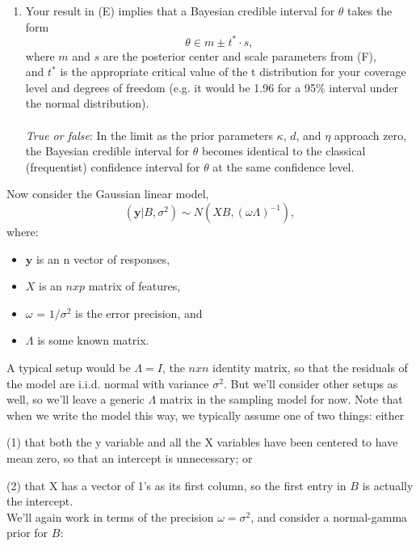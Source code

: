 \documentclass{homework}
\begin{document}
\begin{enumerate}[label=(\Alph*)]
\item Your result in (E) implies that a Bayesian credible interval for $\theta$ takes the form 
$$ \theta \in m \pm t^* \cdot s ,$$ where $m$ and $s$ are the posterior center and scale parameters from (F), \\and $t^*$ is the appropriate critical value of the t distribution for your coverage level and degrees of freedom (e.g. it would be 1.96 for a 95\% interval under the normal distribution).\\ \\
\textit{True or false}: In the limit as the prior parameters $\kappa$, $d$, and $\eta$ approach zero, \\the Bayesian credible interval for $\theta$ becomes identical to the classical (frequentist) confidence interval for $\theta$ at the same confidence level.
\end{enumerate}


Now consider the Gaussian linear model,\\
$$( \textbf{y} | B, \sigma^2) \sim N(XB, (\omega\Lambda)^{-1}),$$ where: 
\begin{itemize}
\item $\textbf{y}$ is an n vector of responses, 
\item $X$ is an $n x p$ matrix of features, 
\item $\omega$ = $1/\sigma^2$ is the error precision, and 
\item $\Lambda$ is some known matrix. 
\end{itemize}
A typical setup would be $\Lambda = I$, the $n x n$ identity matrix, so that the residuals of the model are i.i.d. normal with variance $\sigma^2$. But we'll consider other setups as well, so we'll leave a generic $\Lambda$ matrix in the sampling model for now.  Note that when we write the model this way, we typically assume one of two things: either \par(1) that both the y variable and all the X variables have been centered to have mean zero, so that an intercept is unnecessary; or \par(2) that X has a vector of 1's as its first column, so the first entry in $B$ is actually the intercept.
\\We'll again work in terms of the precision $\omega = \sigma^2$, and consider a normal-gamma prior for $B$:
\end{document}

